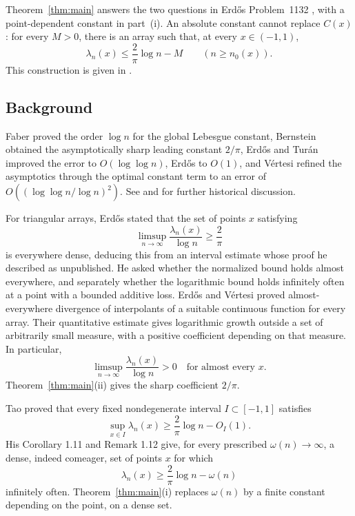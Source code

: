 \documentclass[11pt]{article}
\theoremstyle{remark}
\numberwithin{equation}{section}
\begin{document}
Theorem~\ref{thm:main} answers the two questions in Erd\H{o}s
Problem~1132 \cite{Bloom}, with a point-dependent constant in part~(i).
An absolute constant cannot replace \(C(x)\): for every \(M>0\),
there is an array such that, at every \(x\in(-1,1)\),
\[
 \lambda_n(x)\le\frac2\pi\log n-M\qquad(n\ge n_0(x)).
\]
This construction is given in \cite[Theorem~1]{GuNonuniform}.

\subsection{Background}

Faber \cite{Faber} proved the order \(\log n\) for the global Lebesgue
constant, Bernstein \cite{Bernstein} obtained the asymptotically sharp
leading constant \(2/\pi\), Erd\H{o}s and Tur\'an \cite{ErdosTuran}
improved the error to \(O(\log\log n)\), Erd\H{o}s \cite{Erdos1961}
to \(O(1)\), and V\'ertesi \cite[Corollary~1]{Vertesi1990} refined the
asymptotics through the optimal constant term to an error of
\(O((\log\log n/\log n)^2)\). See
\cite[Section~1.3]{Tao} and \cite{Brutman} for further historical discussion.

For triangular arrays, Erd\H{o}s \cite[p.~68, equation (7)]{Erdos}
stated that the set
of points \(x\) satisfying
\[
 \limsup_{n\to\infty}\frac{\lambda_n(x)}{\log n}\ge\frac2\pi
\]
is everywhere dense, deducing this from an interval estimate whose
proof he described as unpublished. He asked whether the normalized
bound holds almost everywhere, and separately whether the logarithmic
bound holds infinitely often at a point with a bounded additive loss.
Erd\H{o}s and V\'ertesi \cite{ErdosVertesi} proved
almost-everywhere divergence of interpolants of a suitable continuous
function for every array. Their quantitative estimate
\cite[Theorem~2.1]{ErdosVertesi1981} gives logarithmic growth outside
a set of arbitrarily small measure, with a positive coefficient
depending on that measure. In particular,
\[
 \limsup_{n\to\infty}\frac{\lambda_n(x)}{\log n}>0
 \quad\text{for almost every }x.
\]
Theorem~\ref{thm:main}(ii) gives the sharp coefficient \(2/\pi\).

Tao \cite[Theorem 1.10(i)]{Tao} proved that every fixed nondegenerate
interval \(I\subset[-1,1]\) satisfies
\[
 \sup_{x\in I}\lambda_n(x)\ge\frac2\pi\log n-O_I(1).
\]
His Corollary 1.11 and Remark 1.12 give, for every prescribed
\(\omega(n)\to\infty\), a dense, indeed comeager, set of points
\(x\) for which
\[
 \lambda_n(x)\ge\frac2\pi\log n-\omega(n)
\]
infinitely often. Theorem~\ref{thm:main}(i) replaces \(\omega(n)\) by a
finite constant depending on the point, on a dense set.
\end{document}
